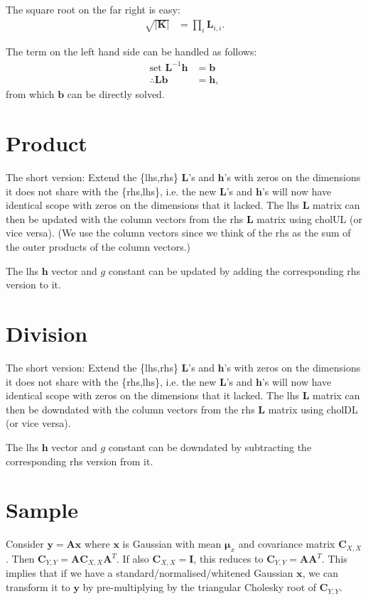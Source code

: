 \documentclass[oneside,english]{scrbook}
\begin{document}
The square root on the far right is easy:
\begin{align*}
  \sqrt{|\bm{K}|} &= \prod_i \bm{L}_{i,i}.
\end{align*}

The term on the left hand side can be handled as follows:
\begin{align*}
  \text{set }\bm{L}^{-1}\bm{h} &= \bm{b} \\
  \therefore \bm{L}\bm{b} &= \bm{h},
\end{align*}
from which $\bm{b}$ can be directly solved.

\section{Product}
The short version: Extend the \{lhs,rhs\} $\bm{L}$'s and $\bm{h}$'s
with zeros on the dimensions it does not share with the \{rhs,lhs\},
i.e. the new $\bm{L}$'s and $\bm{h}$'s will now have identical scope
with zeros on the dimensions that it lacked. The lhs $\bm{L}$ matrix
can then be updated with the column vectors from the rhs $\bm{L}$
matrix using cholUL (or vice versa). (We use the column vectors since
we think of the rhs as the sum of the outer products of the column
vectors.)

The lhs $\bm{h}$ vector and $g$
constant can be updated by adding the corresponding rhs version to it.

\section{Division}
The short version: Extend the \{lhs,rhs\} $\bm{L}$'s and $\bm{h}$'s
with zeros on the dimensions it does not share with the \{rhs,lhs\},
i.e. the new $\bm{L}$'s and $\bm{h}$'s will now have identical scope
with zeros on the dimensions that it lacked. The lhs $\bm{L}$ matrix
can then be downdated with the column vectors from the rhs $\bm{L}$
matrix using cholDL (or vice versa).

The lhs $\bm{h}$ vector and $g$
constant can be downdated by subtracting the corresponding rhs version
from it.

\section{Sample}
Consider $\bm{y} = \bm{A}\bm{x}$ where $\bm{x}$ is Gaussian with mean
$\bm{\mu}_x$ and covariance matrix $\bm{C}_{X,X}$. Then $\bm{C}_{Y,Y} =
\bm{A}\bm{C}_{X,X}\bm{A}^T$.  If also $\bm{C}_{X,X}= \bm{I}$, this
reduces to $\bm{C}_{Y,Y} = \bm{A}\bm{A}^T$. This implies that if we
have a standard/normalised/whitened Gaussian $\bm{x}$, we can
transform it to $\bm{y}$ by pre-multiplying by the triangular
Cholesky root of $\bm{C}_{Y,Y}$.
\end{document}
